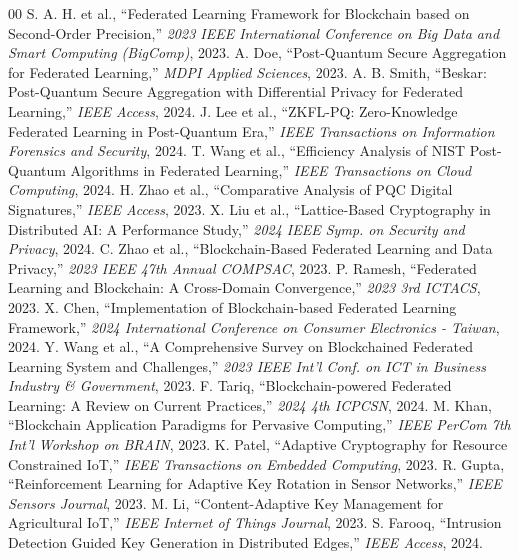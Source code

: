 \documentclass[journal, 10pt, twocolumn]{IEEEtran}
\begin{document}
\begin{thebibliography}{00}
 S. A. H. et al., ``Federated Learning Framework for Blockchain based on Second-Order Precision,'' \textit{2023 IEEE International Conference on Big Data and Smart Computing (BigComp)}, 2023.
 A. Doe, ``Post-Quantum Secure Aggregation for Federated Learning,'' \textit{MDPI Applied Sciences}, 2023.
 A. B. Smith, ``Beskar: Post-Quantum Secure Aggregation with Differential Privacy for Federated Learning,'' \textit{IEEE Access}, 2024.
 J. Lee et al., ``ZKFL-PQ: Zero-Knowledge Federated Learning in Post-Quantum Era,'' \textit{IEEE Transactions on Information Forensics and Security}, 2024.
 T. Wang et al., ``Efficiency Analysis of NIST Post-Quantum Algorithms in Federated Learning,'' \textit{IEEE Transactions on Cloud Computing}, 2024.
 H. Zhao et al., ``Comparative Analysis of PQC Digital Signatures,'' \textit{IEEE Access}, 2023.
 X. Liu et al., ``Lattice-Based Cryptography in Distributed AI: A Performance Study,'' \textit{2024 IEEE Symp. on Security and Privacy}, 2024.
 C. Zhao et al., ``Blockchain-Based Federated Learning and Data Privacy,'' \textit{2023 IEEE 47th Annual COMPSAC}, 2023.
 P. Ramesh, ``Federated Learning and Blockchain: A Cross-Domain Convergence,'' \textit{2023 3rd ICTACS}, 2023.
 X. Chen, ``Implementation of Blockchain-based Federated Learning Framework,'' \textit{2024 International Conference on Consumer Electronics - Taiwan}, 2024.
 Y. Wang et al., ``A Comprehensive Survey on Blockchained Federated Learning System and Challenges,'' \textit{2023 IEEE Int'l Conf. on ICT in Business Industry \& Government}, 2023.
 F. Tariq, ``Blockchain-powered Federated Learning: A Review on Current Practices,'' \textit{2024 4th ICPCSN}, 2024.
 M. Khan, ``Blockchain Application Paradigms for Pervasive Computing,'' \textit{IEEE PerCom 7th Int'l Workshop on BRAIN}, 2023.
 K. Patel, ``Adaptive Cryptography for Resource Constrained IoT,'' \textit{IEEE Transactions on Embedded Computing}, 2023.
 R. Gupta, ``Reinforcement Learning for Adaptive Key Rotation in Sensor Networks,'' \textit{IEEE Sensors Journal}, 2023.
 M. Li, ``Content-Adaptive Key Management for Agricultural IoT,'' \textit{IEEE Internet of Things Journal}, 2023.
 S. Farooq, ``Intrusion Detection Guided Key Generation in Distributed Edges,'' \textit{IEEE Access}, 2024.

\end{thebibliography}
\end{document}
